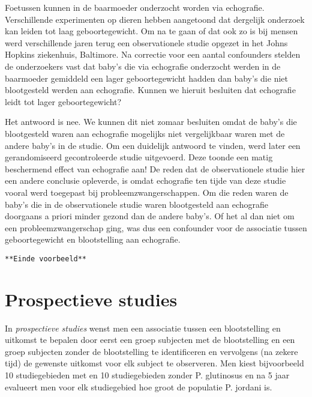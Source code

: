 \documentclass[12pt,dutch,coursenotes]{book}
\theoremstyle{definition}
\theoremstyle{definition}
\theoremstyle{definition}
\theoremstyle{remark}
\begin{document}
Foetussen kunnen in de baarmoeder onderzocht worden via echografie.
Verschillende experimenten op dieren hebben aangetoond dat dergelijk
onderzoek kan leiden tot laag geboortegewicht. Om na te gaan of dat ook
zo is bij mensen werd verschillende jaren terug een observationele
studie opgezet in het Johns Hopkins ziekenhuis, Baltimore. Na correctie
voor een aantal confounders stelden de onderzoekers vast dat baby's die
via echografie onderzocht werden in de baarmoeder gemiddeld een lager
geboortegewicht hadden dan baby's die niet blootgesteld werden aan
echografie. Kunnen we hieruit besluiten dat echografie leidt tot lager
geboortegewicht?

Het antwoord is nee. We kunnen dit niet zomaar besluiten omdat de baby's
die blootgesteld waren aan echografie mogelijks niet vergelijkbaar waren
met de andere baby's in de studie. Om een duidelijk antwoord te vinden,
werd later een gerandomiseerd gecontroleerde studie uitgevoerd. Deze
toonde een matig beschermend effect van echografie aan! De reden dat de
observationele studie hier een andere conclusie opleverde, is omdat
echografie ten tijde van deze studie vooral werd toegepast bij
probleemzwangerschappen. Om die reden waren de baby's die in de
observationele studie waren blootgesteld aan echografie doorgaans a
priori minder gezond dan de andere baby's. Of het al dan niet om een
probleemzwangerschap ging, was dus een confounder voor de associatie
tussen geboortegewicht en blootstelling aan echografie.

\texttt{**Einde\ voorbeeld**}

\section{Prospectieve studies}\label{subsec:design:prosp}

In \emph{prospectieve studies} wenst men een associatie tussen een
blootstelling en uitkomst te bepalen door eerst een groep subjecten met
de blootstelling en een groep subjecten zonder de blootstelling te
identificeren en vervolgens (na zekere tijd) de gewenste uitkomst voor
elk subject te observeren. Men kiest bijvoorbeeld 10 studiegebieden met
en 10 studiegebieden zonder P. glutinosus en na 5 jaar evalueert men
voor elk studiegebied hoe groot de populatie P. jordani is.
\end{document}
